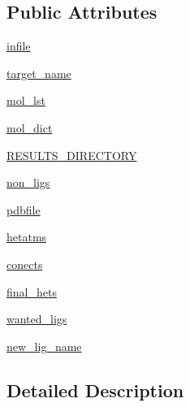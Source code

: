 \subsection*{Public Attributes}
\begin{DoxyCompactItemize}
\item 
\hyperlink{classfragalysis__api_1_1xcimporter_1_1conversion__pdb__mol_1_1_ligand_a32128e8047085e698f5ca00f3c5272a9}{infile}
\item 
\hyperlink{classfragalysis__api_1_1xcimporter_1_1conversion__pdb__mol_1_1_ligand_a7bacd3ad4cf07e41aed7a9f2a4ff387a}{target\+\_\+name}
\item 
\hyperlink{classfragalysis__api_1_1xcimporter_1_1conversion__pdb__mol_1_1_ligand_ac4eb80e71c44f6b864a952f225cd8004}{mol\+\_\+lst}
\item 
\hyperlink{classfragalysis__api_1_1xcimporter_1_1conversion__pdb__mol_1_1_ligand_a19412f84749bbb24a26587412126c63d}{mol\+\_\+dict}
\item 
\hyperlink{classfragalysis__api_1_1xcimporter_1_1conversion__pdb__mol_1_1_ligand_aae0e03b03bc78f6d2df7f84a6df36901}{R\+E\+S\+U\+L\+T\+S\+\_\+\+D\+I\+R\+E\+C\+T\+O\+RY}
\item 
\hyperlink{classfragalysis__api_1_1xcimporter_1_1conversion__pdb__mol_1_1_ligand_a9f563bbab62fe3a11a8922c820b94e42}{non\+\_\+ligs}
\item 
\hyperlink{classfragalysis__api_1_1xcimporter_1_1conversion__pdb__mol_1_1_ligand_ae69abc7403000638fc3a713f52254154}{pdbfile}
\item 
\hyperlink{classfragalysis__api_1_1xcimporter_1_1conversion__pdb__mol_1_1_ligand_a9ca075a4d8a93d03faf8a68d2ca8cb22}{hetatms}
\item 
\hyperlink{classfragalysis__api_1_1xcimporter_1_1conversion__pdb__mol_1_1_ligand_ae95cb0d8d1e5783aa0959ce6fe03256b}{conects}
\item 
\hyperlink{classfragalysis__api_1_1xcimporter_1_1conversion__pdb__mol_1_1_ligand_ad7639b1a8c8c767a298eb7454bf5e3fd}{final\+\_\+hets}
\item 
\hyperlink{classfragalysis__api_1_1xcimporter_1_1conversion__pdb__mol_1_1_ligand_ae4f4ee5bf6c21bd59c1e52da2b4f67b5}{wanted\+\_\+ligs}
\item 
\hyperlink{classfragalysis__api_1_1xcimporter_1_1conversion__pdb__mol_1_1_ligand_af2f58c632ceb036a9502c33f2681aba9}{new\+\_\+lig\+\_\+name}
\end{DoxyCompactItemize}


\subsection{Detailed Description}


